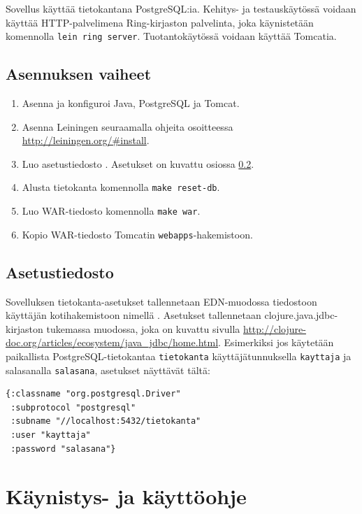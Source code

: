 \documentclass[a4paper,titlepage]{article}
\begin{document}
Sovellus käyttää tietokantana PostgreSQL:ia. Kehitys- ja
testauskäytössä voidaan käyttää HTTP-palvelimena Ring-kirjaston
palvelinta, joka käynistetään komennolla \texttt{lein ring
  server}. Tuotantokäytössä voidaan käyttää Tomcatia.

\subsection{Asennuksen vaiheet}

\begin{enumerate}
\item Asenna ja konfiguroi Java, PostgreSQL ja Tomcat.
\item Asenna Leiningen seuraamalla ohjeita osoitteessa \url{http://leiningen.org/#install}.
\item Luo asetustiedosto . Asetukset on
  kuvattu osiossa \ref{sec:asetustiedosto}.
\item Alusta tietokanta komennolla \texttt{make reset-db}.
\item Luo WAR-tiedosto komennolla \texttt{make war}.
\item Kopio WAR-tiedosto Tomcatin \texttt{webapps}-hakemistoon.
\end{enumerate}

\subsection{Asetustiedosto}
\label{sec:asetustiedosto}

Sovelluksen tietokanta-asetukset tallennetaan EDN-muodossa tiedostoon
käyttäjän kotihakemistoon nimellä
. Asetukset tallennetaan
clojure.java.jdbc-kirjaston tukemassa muodossa, joka on kuvattu
sivulla
\url{http://clojure-doc.org/articles/ecosystem/java_jdbc/home.html}. Esimerkiksi
jos käytetään paikallista PostgreSQL-tietokantaa \texttt{tietokanta}
käyttäjätunnuksella \texttt{kayttaja} ja salasanalla
\texttt{salasana}, asetukset näyttävät tältä:

\begin{lstlisting}[basicstyle=\ttfamily]
{:classname "org.postgresql.Driver"
 :subprotocol "postgresql"
 :subname "//localhost:5432/tietokanta"
 :user "kayttaja"
 :password "salasana"}
\end{lstlisting}

\section{Käynistys- ja käyttöohje}
\end{document}
